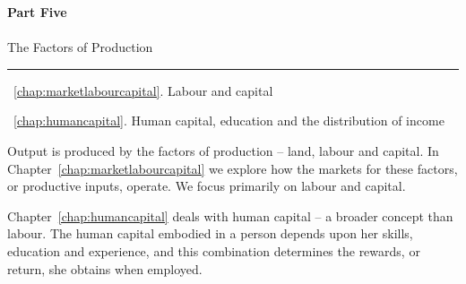 \cleardoublepage
\thispagestyle{empty}
\vspace{30mm}
{\color{parttextcolour}\fontsize{1.25cm}{3em}\selectfont\textbf{Part Five}} \\ \\
{\color{parttextcolour}\huge The Factors of Production}

\vspace{10mm}
{\color{partlinecolour}\rule{25em}{2pt}}
\vspace{10mm}

{\large\color{parttextcolour}
~\ref{chap:marketlabourcapital}. Labour and capital

~\ref{chap:humancapital}. Human capital, education and the distribution of income}

\vspace{10mm}

{\normalfont Output is produced by the factors of production -- land, labour and capital. In Chapter~\ref{chap:marketlabourcapital} we explore how the markets for these factors, or productive inputs, operate. We focus primarily on labour and capital.

Chapter~\ref{chap:humancapital} deals with human capital -- a broader concept than labour. The human capital embodied in a person depends upon her skills, education and experience, and this combination determines the rewards, or return, she obtains when employed.}

